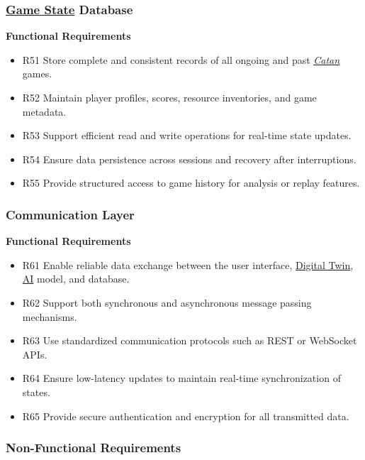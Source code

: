 \documentclass{article}
\newcommand{\Catan}{\href{https://en.wikipedia.org/wiki/Catan}{Catan}}
\newcommand{\AI}{\href{https://en.wikipedia.org/wiki/Artificial_intelligence}{AI}}
\newcommand{\DigitalTwin}{\href{https://en.wikipedia.org/wiki/Digital_twin}{Digital Twin}}
\newcommand{\GameState}{\href{https://milvus.io/ai-quick-reference/what-is-a-state-in-rl}{Game State}}
\begin{document}
\subsubsection{\GameState{} Database}

\textbf{Functional Requirements}

\begin{itemize}
  \item R51 Store complete and consistent records of all ongoing and past \emph{\Catan{}} games.
  \item R52 Maintain player profiles, scores, resource inventories, and game metadata.
  \item R53 Support efficient read and write operations for real-time state updates.
  \item R54 Ensure data persistence across sessions and recovery after interruptions.
  \item R55 Provide structured access to game history for analysis or replay features.

\end{itemize}

\subsubsection{Communication Layer}

\textbf{Functional Requirements}

\begin{itemize}
  \item R61 Enable reliable data exchange between the user interface, \DigitalTwin{},
        \AI{} model, and database.
  \item R62 Support both synchronous and asynchronous message passing mechanisms.
  \item R63 Use standardized communication protocols such as REST or WebSocket APIs.
  \item R64 Ensure low-latency updates to maintain real-time synchronization of states.
  \item R65 Provide secure authentication and encryption for all transmitted data.

\end{itemize}

\subsubsection{Non-Functional Requirements}
\end{document}
